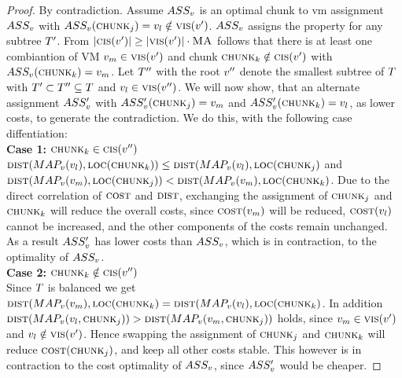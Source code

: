 \begin{proof}
 By contradiction. Assume $ASS_v$ is an optimal chunk to vm 
assignment $ASS_v$ with $ASS_v(\textsc{chunk}_j) 
=v_l \notin \textsc{vis}(v')$. $ASS_v$ assigns 
the property for any subtree $T'$. From $|\textsc{cis}(v')| 
\geq 
|\textsc{vis}(v')| \cdot \textsc{MA}$ follows that there is at least one 
combiantion of 
VM 
$v_m \in \textsc{vis}(v')$ and chunk $\textsc{chunk}_k \notin 
\textsc{cis}(v')$ with $ASS_v(\textsc{chunk}_k) = 
v_m$. Let $T''$ with the root $v''$ denote the 
smallest subtree of $T$ with $T' \subset T'' \subseteq T$ and 
$v_l \in \textsc{vis}(v'')$. We will now show, that an 
alternate assignment $ASS_v'$ with 
$ASS_v'(\textsc{chunk}_j) = v_m$ and 
$ASS_v'(\textsc{chunk}_k) = v_l$, as lower costs, to generate 
the contradiction. We do this, with the following case diffentiation: 
\\
\textbf{Case 1:} $\textsc{chunk}_k \in \textsc{cis}(v'')$\\
$\textsc{dist}(MAP_v(v_l), \textsc{loc}(\textsc{chunk}_k)) \leq 
\textsc{dist}(MAP_v(v_l), \textsc{loc}(\textsc{chunk}_j)$ and 
$\textsc{dist}(MAP_v(v_m), \textsc{loc}(\textsc{chunk}_j)) < 
\textsc{dist}(MAP_v(v_m), \textsc{loc}(\textsc{chunk}_k)$. Due to the 
direct correlation of $\textsc{cost}$ and $\textsc{dist}$, exchanging the 
assignment of $\textsc{chunk}_j$ and $\textsc{chunk}_k$ will reduce the overall costs, since 
$\textsc{cost}(v_m)$ will be reduced, 
$\textsc{cost}(v_l)$ cannot be increased, and the other components 
of the costs remain unchanged. As a result $ASS_v'$ has lower 
costs than $ASS_v$, which is in contraction, to the optimality of
$ASS_v$.\\
\textbf{Case 2:} $\textsc{chunk}_k \notin \textsc{cis}(v'')$\\
Since $T$ is balanced we get $\textsc{dist}(MAP_v(v_m), 
\textsc{loc}(\textsc{chunk}_k)  = \textsc{dist}(MAP_v(v_l), 
\textsc{loc}(\textsc{chunk}_k)$. In addition $\textsc{dist}(MAP_v(v_l, 
\textsc{chunk}_j)) > \textsc{dist}(MAP_v(v_m, 
\textsc{chunk}_j)) $ holds, since $v_m \in \textsc{vis}(v')$ and 
$v_l \notin 
\textsc{vis}(v')$. Hence swapping the assignment of $\textsc{chunk}_j$ and 
$\textsc{chunk}_k$ will reduce $\textsc{cost}(\textsc{chunk}_j)$, and keep all other costs 
stable. This however is in contraction to the cost optimality of 
$ASS_v$, since $ASS_v'$ would be cheaper.
\end{proof}

